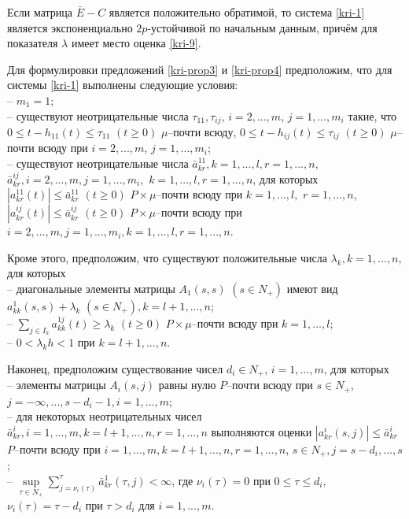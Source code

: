\begin{proposition}\label{kri-prop2}  Если матрица $\bar E - C$ является
положительно обратимой, то система \eqref{kri-1} является экспоненциально
${2p}$-устойчивой по начальным данным, причём для показателя
$\lambda$ имеет место оценка \eqref{kri-9}.
\end{proposition}

Для формулировки предложений \ref{kri-prop3} и \ref{kri-prop4} предположим, что для системы \eqref{kri-1} выполнены следующие условия:\\
\noindent
  -- $m_1 =1$;\\
   -- существуют неотрицательные числа
$\tau_{11}, \tau_{ij}$, $i = 2,...,m$, $j = 1,...,m_i$  такие, что
$0 \leq t- h_{11}(t) \leq \tau _{11} {\,} {\,} (t \geq 0)$ $\mu
$--почти всюду, $0 \leq t- h_{ij}(t) \leq \tau _{ij} {\,} {\,} (t
\geq 0)$ $\mu $--почти всюду при $i = 2,...,m$, $j = 1,...,m_i$;\\
  -- существуют неотрицательные числа
$\bar a^{11}_{kr},  k =1,...,l, r = 1,...,n$, $\bar a^{ij}_{kr}, i =
2,...,m, j = 1,...,m_i,$ $k =1,...,l, r = 1,...,n$,  для которых
$|a^{11}_{kr}(t)|\leq \bar a^{11}_{kr} \,\, (t\geq 0) $
$P\times\mu$--почти всюду при $k =1,...,l,$ $r = 1,...,n$,
$|a^{ij}_{kr}(t)| \leq \bar a^{ij}_{kr} \,\, (t\geq 0) $
$P\times\mu$--почти всюду при $i = 2, ..., m, j = 1,...,m_i, k
=1,...,l, r = 1,...,n$.

Кроме этого, предположим, что существуют положительные числа
$\lambda _k, k = 1, ..., n$, для которых\\
\noindent
-- диагональные
элементы матрицы $ A_1(s,s)$ $(s \in N_+)$ имеют вид
$a_{kk}^{1}(s,s) + \lambda _k \,\, (s \in N_+), k=l + 1, ..., n$;\\
-- $\sum \limits_{j\in I_k}a^{1j}_{kk}(t)  \geq \lambda _k
\,\, (t\geq 0)$ $P\times\mu$--почти всюду при $k = 1,...,l$;\\
-- $0 < \lambda _kh < 1$
при $ k = l + 1, ..., n$.

Наконец, предположим существование чисел $d_i \in N_+$, $i =
1,...,m$, для которых\\
\noindent
 --
 элементы матрицы $A_i(s,j)$ равны нулю
$P$--почти всюду при $s \in N_+$, $j=-\infty,...,s-d_i-1,
i=1,...,m$;\\
-- для некоторых неотрицательных чисел $\bar
a^i_{kr},i=1,...,m, k = l+1, ..., n, r = 1,...,n$ выполняются оценки
$|a^i_{kr}(s,j)| \leq \bar a^i_{kr}$ $P$--почти всюду при
$i=1,...,m, k = l+1, ..., n, r = 1,...,n$, $s \in N_+, j = s - d_i,
..., s$;\\
--  $\mathrel {\mathop {\sup} \limits _{\tau \in N_+}}\sum
\limits _{j=\nu _i (\tau)}^{\tau}\bar a^{1}_{kr}(\tau,j) < \infty $,
где $\nu _i (\tau) = 0$ при $0 \le \tau \le d_i$, $\nu _i (\tau) =
\tau - d_i$ при $\tau > d_i$ для  $i= 1,...,m$.

